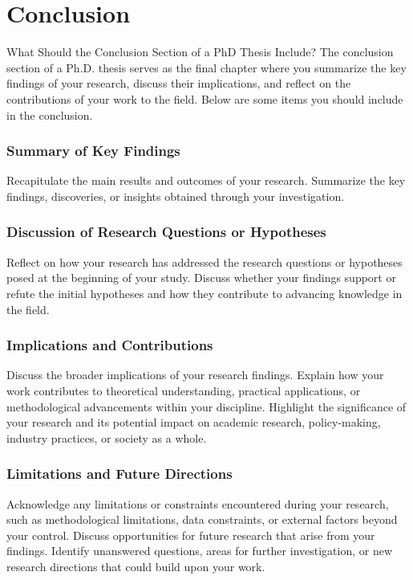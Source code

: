 \chapter{Conclusion}

What Should the Conclusion Section of a PhD Thesis Include?
The conclusion section of a Ph.D. thesis serves as the final chapter where you summarize the key findings of your research, discuss their implications, and reflect on the contributions of your work to the field.
Below are some items you should include in the conclusion.

\subsection{Summary of Key Findings}
Recapitulate the main results and outcomes of your research.
Summarize the key findings, discoveries, or insights obtained through your investigation.
    
    
\subsection{Discussion of Research Questions or Hypotheses}
Reflect on how your research has addressed the research questions or hypotheses posed at the beginning of your study.
Discuss whether your findings support or refute the initial hypotheses and how they contribute to advancing knowledge in the field.
    
    
\subsection{Implications and Contributions}
Discuss the broader implications of your research findings. Explain how your work contributes to theoretical understanding, practical applications, or methodological advancements within your discipline.
Highlight the significance of your research and its potential impact on academic research, policy-making, industry practices, or society as a whole.
    
    
\subsection{Limitations and Future Directions}
Acknowledge any limitations or constraints encountered during your research, such as methodological limitations, data constraints, or external factors beyond your control.
Discuss opportunities for future research that arise from your findings.
Identify unanswered questions, areas for further investigation, or new research directions that could build upon your work.
    

